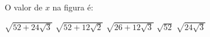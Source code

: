 O valor de $x$ na figura \'e:

\parbox{0.59\linewidth}{

$\sqrt{52+24\sqrt{3}}$
$\sqrt{52+12\sqrt{2}}$
$\sqrt{26+12\sqrt{3}}$
$\sqrt{52}$
$\sqrt{24\sqrt{3}}$

}\parbox{0.4\linewidth}{
\begin{center}
\vspace{-2mm}
\vspace{-6mm}
\end{center}
}



